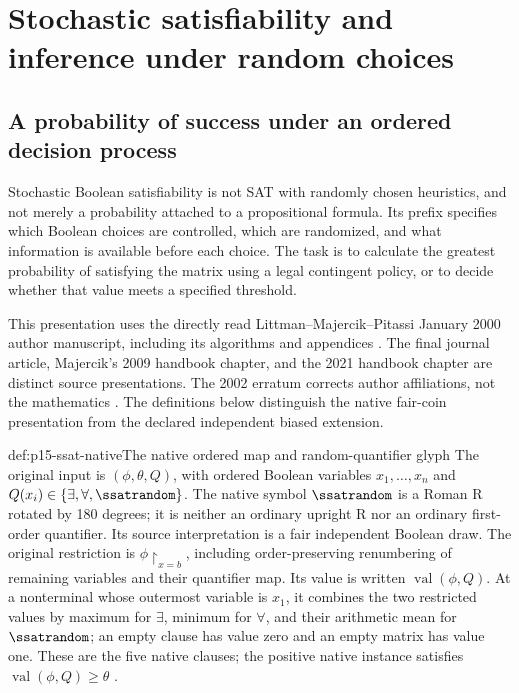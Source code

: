 \chapter{Stochastic satisfiability and inference under random choices}
\label{sec:p15-stochastic-satisfiability-and-inference}

\section{A probability of success under an ordered decision process}
\label{sec:p15-ssat-purpose}

Stochastic Boolean satisfiability is not SAT with randomly chosen
heuristics, and not merely a probability attached to a propositional
formula. Its prefix specifies which Boolean choices are controlled,
which are randomized, and what information is available before each
choice. The task is to calculate the greatest probability of satisfying
the matrix using a legal contingent policy, or to decide whether that
value meets a specified threshold.

This presentation uses the directly read Littman--Majercik--Pitassi
January 2000 author manuscript, including its algorithms and appendices
\cite{LittmanMajercikPitassi2000SSATAuthor}. The final journal article,
Majercik's 2009 handbook chapter, and the 2021
handbook chapter are distinct source presentations. The 2002 erratum corrects author
affiliations, not the mathematics
\cite{LittmanMajercikPitassi2002SSATErratum}. The definitions below distinguish
the native fair-coin presentation from the declared independent biased extension.

\begin{hbdefinition}{def:p15-ssat-native}{The native ordered map and random-quantifier glyph}
The original input is \((\phi,\theta,Q)\), with ordered Boolean
variables \(x_1,\ldots,x_n\) and
\(Q(x_i)\in\{\exists,\forall,\ssatrandom\}\).
The native symbol \(\ssatrandom\) is a Roman R rotated by 180 degrees;
it is neither an ordinary upright R nor an ordinary first-order quantifier.
Its source interpretation is a fair independent Boolean draw.
The original restriction is \(\phi\upharpoonright_{x=b}\), including
order-preserving renumbering of remaining variables and their quantifier map.
Its value is written \(\operatorname{val}(\phi,Q)\). At a nonterminal
whose outermost variable is \(x_1\), it combines the two restricted
values by maximum for \(\exists\), minimum for \(\forall\), and
their arithmetic mean for \(\ssatrandom\); an empty clause has value
zero and an empty matrix has value one. These are the five native clauses;
the positive native instance satisfies \(\operatorname{val}(\phi,Q)\geq\theta\)
\cite[Table~I and pp.~3--4]{LittmanMajercikPitassi2000SSATAuthor}.
\end{hbdefinition}

